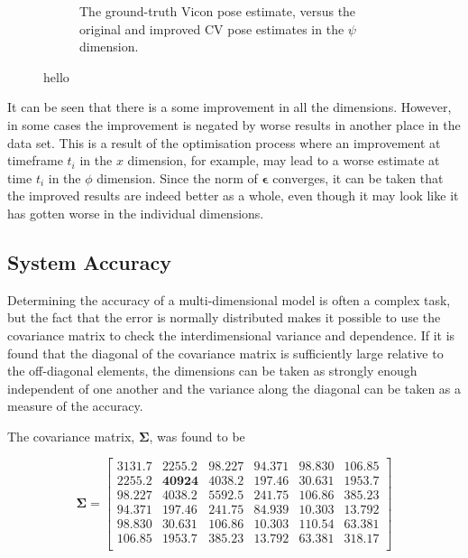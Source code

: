 \begin{figure}
\begin{subfigure}{0.45\textwidth}
    \caption{The ground-truth Vicon pose estimate, versus the original and improved CV pose estimates in the $\psi$ dimension.}
  \label{fig:estimate-yaw}
  \end{subfigure}
  \caption{hello}
  \label{fig:estimate}
\end{figure}

It can be seen that there is a some improvement in all the dimensions. However, in some cases the improvement is negated by worse results in another place in the data set. This is a result of the optimisation process where an improvement at timeframe $t_i$ in the $x$ dimension, for example, may lead to a worse estimate at time $t_i$ in the $\phi$ dimension. Since the norm of $\bm{\epsilon}$ converges, it can be taken that the improved results are indeed better as a whole, even though it may look like it has gotten worse in the individual dimensions.

\subsection{System Accuracy}

Determining the accuracy of a multi-dimensional model is often a complex task, but the fact that the error is normally distributed makes it possible to use the covariance matrix to check the interdimensional variance and dependence. If it is found that the diagonal of the covariance matrix is sufficiently large relative to the off-diagonal elements, the dimensions can be taken as strongly enough independent of one another and the variance along the diagonal can be taken as a measure of the accuracy. 

The covariance matrix, $\bm{\Sigma}$, was found to be 

\[
  \bm{\Sigma} = 
  \begin{bmatrix}
    \bm{3131.7} & 2255.2 & 98.227 & 94.371 &  98.830 & 106.85 \\ 
    2255.2 & \bm{40924}  & 4038.2 & 197.46 &  30.631 & 1953.7 \\
    98.227 & 4038.2 & \bm{5592.5} & 241.75 &  106.86 & 385.23 \\
    94.371 & 197.46 & 241.75 & \bm{84.939} &  10.303 & 13.792 \\
    98.830 & 30.631 & 106.86 & 10.303 &  \bm{110.54} & 63.381 \\
    106.85 & 1953.7 & 385.23 & 13.792 &  63.381 & \bm{318.17} \\
  \end{bmatrix}
\]


